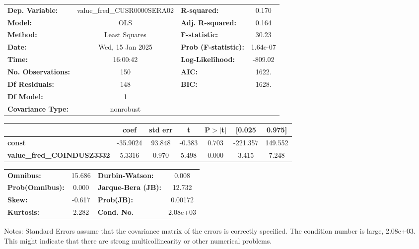 \begin{center}
\begin{tabular}{lclc}
\toprule
\textbf{Dep. Variable:}            & value\_fred\_CUSR0000SERA02 & \textbf{  R-squared:         } &     0.170   \\
\textbf{Model:}                    &             OLS             & \textbf{  Adj. R-squared:    } &     0.164   \\
\textbf{Method:}                   &        Least Squares        & \textbf{  F-statistic:       } &     30.23   \\
\textbf{Date:}                     &       Wed, 15 Jan 2025      & \textbf{  Prob (F-statistic):} &  1.64e-07   \\
\textbf{Time:}                     &           16:00:42          & \textbf{  Log-Likelihood:    } &   -809.02   \\
\textbf{No. Observations:}         &               150           & \textbf{  AIC:               } &     1622.   \\
\textbf{Df Residuals:}             &               148           & \textbf{  BIC:               } &     1628.   \\
\textbf{Df Model:}                 &                 1           & \textbf{                     } &             \\
\textbf{Covariance Type:}          &          nonrobust          & \textbf{                     } &             \\
\bottomrule
\end{tabular}
\begin{tabular}{lcccccc}
                                   & \textbf{coef} & \textbf{std err} & \textbf{t} & \textbf{P$> |$t$|$} & \textbf{[0.025} & \textbf{0.975]}  \\
\midrule
\textbf{const}                     &     -35.9024  &       93.848     &    -0.383  &         0.703        &     -221.357    &      149.552     \\
\textbf{value\_fred\_COINDUSZ3332} &       5.3316  &        0.970     &     5.498  &         0.000        &        3.415    &        7.248     \\
\bottomrule
\end{tabular}
\begin{tabular}{lclc}
\textbf{Omnibus:}       & 15.686 & \textbf{  Durbin-Watson:     } &    0.008  \\
\textbf{Prob(Omnibus):} &  0.000 & \textbf{  Jarque-Bera (JB):  } &   12.732  \\
\textbf{Skew:}          & -0.617 & \textbf{  Prob(JB):          } &  0.00172  \\
\textbf{Kurtosis:}      &  2.282 & \textbf{  Cond. No.          } & 2.08e+03  \\
\bottomrule
\end{tabular}
\end{center}

Notes: \newline
 [1] Standard Errors assume that the covariance matrix of the errors is correctly specified. \newline
 [2] The condition number is large, 2.08e+03. This might indicate that there are \newline
 strong multicollinearity or other numerical problems.